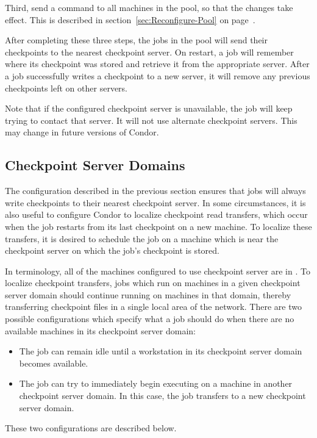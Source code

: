 Third, send a
 command to all machines in the pool, 
so that the changes take effect.
This is described in section~\ref{sec:Reconfigure-Pool} on
page~\pageref{sec:Reconfigure-Pool}.

After completing these three steps, the jobs in the pool will
send their checkpoints to the nearest checkpoint server.
On restart, a job will remember where its checkpoint was
stored and retrieve it from the appropriate server.
After a job successfully writes a checkpoint to a new server, it will
remove any previous checkpoints left on other servers.

Note that if the configured checkpoint server is unavailable,
the job will keep trying to contact that server.
It will not use alternate checkpoint servers.
This may change in future versions of Condor.

\subsection{\label{Checkpoint-Server-Domains} 
Checkpoint Server Domains}

The configuration described in the previous section ensures that jobs
will always write checkpoints to their nearest checkpoint server.  In
some circumstances, it is also useful to configure Condor to localize
checkpoint read transfers, which occur when the job restarts from its
last checkpoint on a new machine.  To localize these transfers, 
it is desired
to schedule the job on a machine which is near the checkpoint
server on which the job's checkpoint is stored.

In terminology, all of the machines configured to use checkpoint
server  are in .
To localize checkpoint transfers, 
jobs which run on machines in a given
checkpoint server domain should continue running on machines in that domain,
thereby transferring checkpoint files in a single local area of the network.
There are two possible configurations which specify what a
job should do when there are no available machines in its checkpoint
server domain:
\begin{itemize}
\item The job can remain idle until a workstation in its checkpoint
server domain becomes available.
\item The job can try to immediately begin executing on a machine
in another checkpoint server domain.  In this case, the job transfers
to a new checkpoint server domain.
\end{itemize}
These two configurations are described below.

